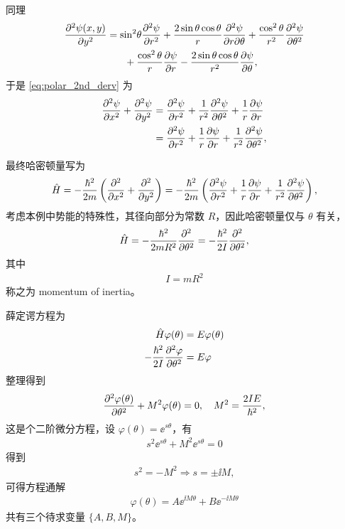 同理
\begin{align}
    \pdv[2]{\psi(x,y)}{y} &= \sin^2\!\theta \pdv[2]{\psi}{r} + \frac{2\sin\theta \cos\theta}{r} \pdv[2]{\psi}{r}{\theta} + \frac{\cos^2\theta}{r^2} \pdv[2]{\psi}{\theta} \notag\\
    &\phantom{=}\quad+ \frac{\cos^2\theta}{r} \pdv{\psi}{r} - \frac{2\sin\theta \cos\theta}{r^2} \pdv{\psi}{\theta}, 
\end{align}
于是 \eqref{eq:polar_2nd_derv} 为
\begin{align}
    \pdv[2]{\psi}{x} + \pdv[2]{\psi}{y} &= \pdv[2]{\psi}{r} + \frac1{r^2} \pdv[2]{\psi}{\theta} + \frac1r \pdv{\psi}{r} \\
    &=\pdv[2]{\psi}{r} + \frac1r \pdv{\psi}{r} + \frac1{r^2}\pdv[2]{\psi}{\theta}, 
\end{align}

最终哈密顿量写为
\begin{align}
    \hat H = - \frac{\hbar^2}{2m} \left(\pdv[2]{x} + \pdv[2]{y}\right) = -\frac{\hbar^2}{2m} \left(\pdv[2]{\psi}{r} + \frac1r \pdv{\psi}{r} + \frac1{r^2}\pdv[2]{\psi}{\theta}\right),
\end{align}
考虑本例中势能的特殊性，其径向部分为常数 $R$，因此哈密顿量仅与 $\theta$ 有关，
\begin{align}
    \hat H = - \frac{\hbar^2}{2mR^2} \pdv[2]{\theta} = -\frac{\hbar^2}{2I} \pdv[2]{\theta},
\end{align}
其中
\begin{eqnarray}
    I = m R^2
\end{eqnarray}
称之为 momentum of inertia。%

薛定谔方程为
\begin{align}
    \hat H \varphi(\theta) &= E\varphi(\theta)\\
    - \frac{\hbar^2}{2I} \pdv[2]{\varphi}{\theta} &= E\varphi
\end{align}
整理得到
\begin{align}
    \pdv[2]{\varphi(\theta)}{\theta} + M^2 \varphi(\theta) = 0, \quad M^2 = \frac{2IE}{\hbar^2},
\end{align}
这是个二阶微分方程，设 $\varphi(\theta) = \ee^{s\theta}$，有
\begin{align}
    s^2 \ee^{s\theta} + M^2 \ee^{s\theta} = 0
\end{align}
得到
\begin{align}
    s^2 = - M^2 \Rightarrow s = \pm \ii M,
\end{align}
可得方程通解
\begin{align}
    \varphi(\theta) = A \ee^{\ii M\theta} + B \ee^{-\ii M \theta}
\end{align}
共有三个待求变量 $\{A, B, M\}$。

